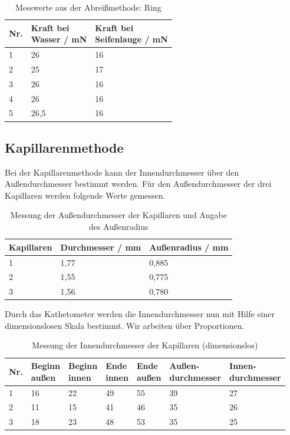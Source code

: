 \documentclass{article}
\begin{document}
\begin{table}[h]
\caption{Messwerte aus der Abreißmethode: Ring}
\begin{tabular}{lll}
Nr. & \shortstack[l]{Kraft bei\\Wasser / mN} & \shortstack[l]{Kraft bei\\Seifenlauge / mN} \\
\hline
1 & 26 & 16 \\
2 & 25 & 17 \\
3 & 26 & 16 \\
4 & 26 & 16 \\
5 & 26,5 & 16
\end{tabular}
\end{table}




\subsection{Kapillarenmethode}

Bei der Kapillarenmethode kann der Innendurchmesser über den Außendurchmesser bestimmt werden. Für den Außendurchmesser der drei Kapillaren werden folgende Werte gemessen.

\begin{table}[h]
\caption{Messung der Außendurchmesser der Kapillaren und Angabe des Außenradius}

\begin{tabular}{lll}
Kapillaren & Durchmesser / mm & Außenradius / mm \\
\hline
1 & 1,77 & 0,885 \\
2 & 1,55 & 0,775 \\
3 & 1,56 & 0,780
\end{tabular}
\end{table}

Durch das Kathetometer werden die Innendurchmesser nun mit Hilfe einer dimensionslosen Skala bestimmt. Wir arbeiten über Proportionen.

\begin{table}[H]
\caption{Messung der Innendurchmesser der Kapillaren (dimensionslos)}
\label{tab:kapillaren}

\begin{tabular}{lllll|ll}
Nr. & \shortstack[l]{Beginn\\außen} & \shortstack[l]{Beginn\\innen} & \shortstack[l]{Ende\\innen} & \shortstack[l]{Ende\\außen} & \shortstack[l]{Außen-\\durchmesser} & \shortstack[l]{Innen-\\durchmesser} \\
\hline
1 & 16 & 22 & 49 & 55 & 39 & 27  \\
2 & 11 & 15 & 41 & 46 & 35 & 26 \\
3 & 18 & 23 & 48 & 53 & 35 & 25
\end{tabular}
\end{table}
\end{document}
